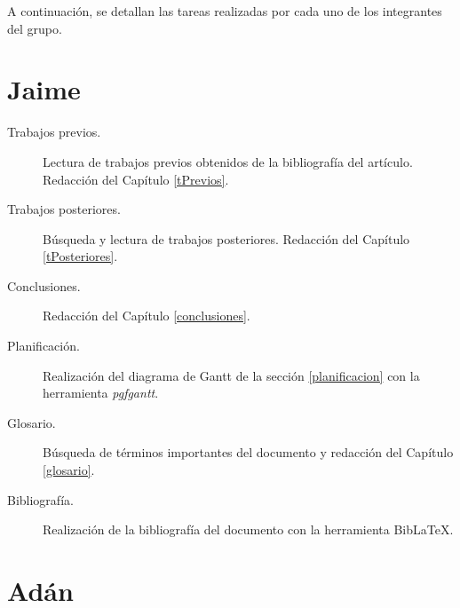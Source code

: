 \documentclass[a4paper,11pt]{report}
\begin{document}

A continuación, se detallan las tareas realizadas por cada uno de los integrantes del grupo.

\section*{Jaime}

\begin{description}
\item[Trabajos previos.] Lectura de trabajos previos obtenidos de la bibliografía del artículo. Redacción del Capítulo \ref{tPrevios}.
\item[Trabajos posteriores.] Búsqueda y lectura de trabajos posteriores. Redacción del Capítulo \ref{tPosteriores}.
\item[Conclusiones.] Redacción del Capítulo \ref{conclusiones}.
\item[Planificación.] Realización del diagrama de Gantt de la sección \ref{planificacion} con la herramienta \emph{pgfgantt}.
\item[Glosario.] Búsqueda de términos importantes del documento y redacción del Capítulo \ref{glosario}.
\item[Bibliografía.] Realización de la bibliografía del documento con la herramienta Bib\LaTeX.
\end{description}

\section*{Adán}

\end{document}
